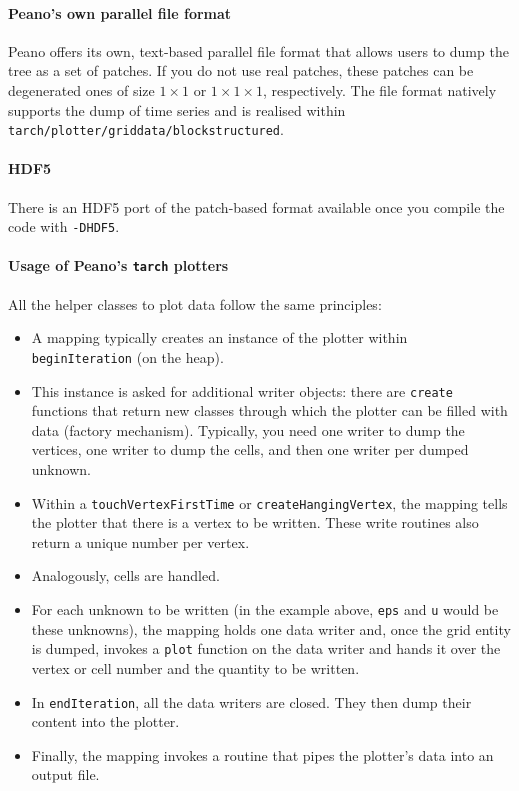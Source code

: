 \paragraph{Peano's own parallel file format}
Peano offers its own, text-based parallel file format that allows users to dump
the tree as a set of patches.
If you do not use real patches, these patches can be degenerated ones of size
$1 \times 1$ or $1 \times 1 \times 1$, respectively.
The file format natively supports the dump of time series and is realised
within \texttt{tarch/plotter/griddata/blockstructured}.


\paragraph{HDF5}
There is an HDF5 port of the patch-based format available once you compile
the code with \texttt{-DHDF5}.



\paragraph{Usage of Peano's \texttt{tarch} plotters}
All the helper classes to plot data follow the same principles:
\begin{itemize}
  \item A mapping typically creates an instance of the plotter within
  \texttt{beginIteration} (on the heap).
  \item This instance is asked for additional writer objects: there are
  \texttt{create} functions that return new classes through which the plotter
  can be filled with data (factory mechanism). Typically, you need one writer
  to dump the vertices, one writer to dump the cells, and then one writer per
  dumped unknown.
  \item Within a \texttt{touchVertexFirstTime} or \texttt{createHangingVertex},
  the mapping tells the plotter that there is a vertex to be written. These
  write routines also return a unique number per vertex.
  \item Analogously, cells are handled.
  \item For each unknown to be written (in the example above, \texttt{eps} and
  \texttt{u} would be these unknowns), the mapping holds one data writer and,
  once the grid entity is dumped, invokes a \texttt{plot} function on the data
  writer and hands it over the vertex or cell number and the quantity to be
  written.
  \item In \texttt{endIteration}, all the data writers are closed. They then
  dump their content into the plotter. 
  \item Finally, the mapping invokes a routine that pipes the plotter's data
  into an output file.
\end{itemize}


